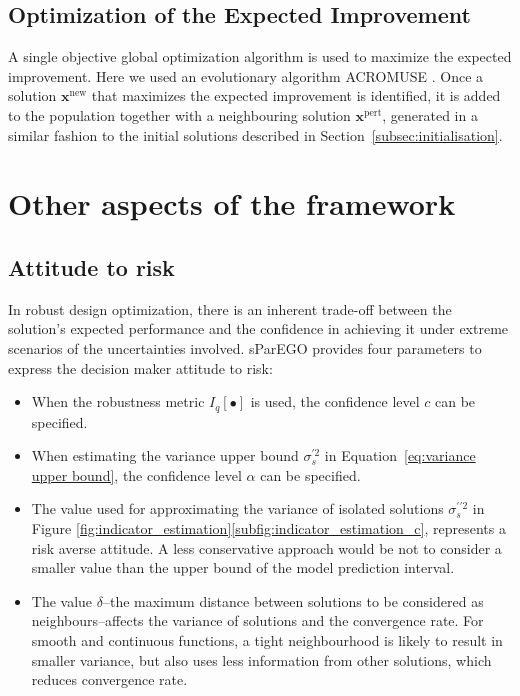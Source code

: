 \documentclass[10pt]{llncs}
\newcommand{\Iq}[1]{I_q\!\left[{#1}\right]} %
\newcommand{\vx}{\mathbf{x}} %
\begin{document}
\subsection{Optimization of the Expected Improvement}
A single objective global optimization algorithm is used to maximize the expected improvement.
Here we used an evolutionary algorithm ACROMUSE \cite{Ginley2011}.
Once a solution $\vx^\text{new}$ that maximizes the expected improvement is identified, it is added to the population together with a neighbouring solution $\vx^\text{pert}$, generated in a similar fashion to the initial solutions described in Section~\ref{subsec:initialisation}.

\section{Other aspects of the framework}
\label{sec:Other aspects}
\subsection{Attitude to risk}
\label{subsec:risk}
In robust design optimization, there is an inherent trade-off between the solution's expected performance and the confidence in achieving it under extreme scenarios of the uncertainties involved. sParEGO provides four parameters to express the decision maker attitude to risk:
\begin{itemize}
	\item When the robustness metric $\Iq{\bullet}$ is used, the confidence level $c$ can be specified.
	\item When estimating the variance upper bound $\sigma^{\prime 2}_s$  in Equation~\eqref{eq:variance upper bound}, the confidence level $\alpha$ can be specified.
	\item The value used for approximating the variance of isolated solutions $\sigma^{\prime\prime 2}_s$ in Figure \ref{fig:indicator_estimation}\ref{subfig:indicator_estimation_c}, represents a risk averse attitude. A less conservative approach would be not to consider a smaller value than the upper bound of the model prediction interval.
	\item The value $\delta$--the maximum distance between solutions to be considered as neighbours--affects the variance of solutions and the convergence rate.
		For smooth and continuous functions, a tight neighbourhood is likely to result in smaller variance, but also uses less information from other solutions, which reduces convergence rate.
\end{itemize}
\end{document}
